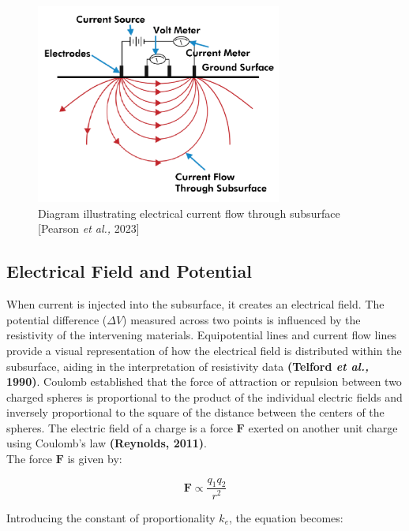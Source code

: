 \documentclass[12pt,a4paper]{report}
\begin{document}
\begin{figure}[H]
    \centering
    \includegraphics[width=0.72\textwidth]{current-flow.png}
    \caption{Diagram illustrating electrical current flow through subsurface [Pearson \textit{et al.,} 2023]}
    \label{fig:current-flow}
\end{figure}

\subsection{Electrical Field and Potential}
When current is injected into the subsurface, it creates an electrical field. The potential difference ($\Delta V$) measured across two points is influenced by the resistivity of the intervening materials. Equipotential lines and current flow lines provide a visual representation of how the electrical field is distributed within the subsurface, aiding in the interpretation of resistivity data \textbf{(Telford \textit{et al.,} 1990)}. Coulomb established that the force of attraction or repulsion between two charged spheres is proportional to the product of the individual electric fields and inversely proportional to the square of the distance between the centers of the spheres. The electric field of a charge is a force \(\mathbf{F}\) exerted on another unit charge using Coulomb's law \textbf{(Reynolds, 2011)}. \\
The force \(\mathbf{F}\) is given by:

\begin{equation}
\mathbf{F} \propto \frac{q_1 q_2}{r^2}
\end{equation}

Introducing the constant of proportionality \(k_e\), the equation becomes:
\end{document}

